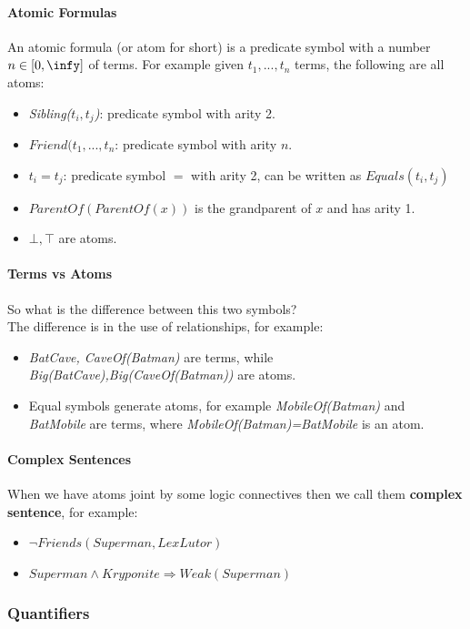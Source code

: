 \documentclass[10pt,a4paper]{article}
\begin{document}
\paragraph{Atomic Formulas}
An atomic formula (or atom for short) is a predicate symbol with a number $n\in [0,\infy]$ of terms. For example given $t_1,...,t_n$ terms, the following are all atoms:
\begin{itemize}
\item \textit{Sibling($t_i,t_j$)}:  predicate symbol with arity 2.
\item $Friend(t_1,...,t_n$: predicate symbol with arity $n$.
\item $t_i=t_j$: predicate symbol $=$ with arity 2, can be written as $Equals(t_i,t_j)$
\item $ParentOf(ParentOf(x))$ is the grandparent of $x$ and has arity 1.
\item $\bot ,\top$ are atoms.
\end{itemize}

\paragraph{Terms vs Atoms}
So what is the difference between this two symbols?\\
The difference is in the use of relationships, for example:
\begin{itemize}
\item \textit{BatCave, CaveOf(Batman)} are terms, while \textit{Big(BatCave),Big(CaveOf(Batman))} are atoms.
\item Equal symbols generate atoms, for example \textit{MobileOf(Batman)} and \textit{BatMobile} are terms, where \textit{MobileOf(Batman)=BatMobile} is an atom.
\end{itemize}

\paragraph{Complex Sentences}
When we have atoms joint by some logic connectives then we call them \textbf{complex sentence}, for example:
\begin{itemize}
\item $\neg Friends(Superman,LexLutor)$
\item $Superman\wedge Kryponite \Rightarrow Weak(Superman)$
\end{itemize}

\subsubsection{Quantifiers}
\end{document}
